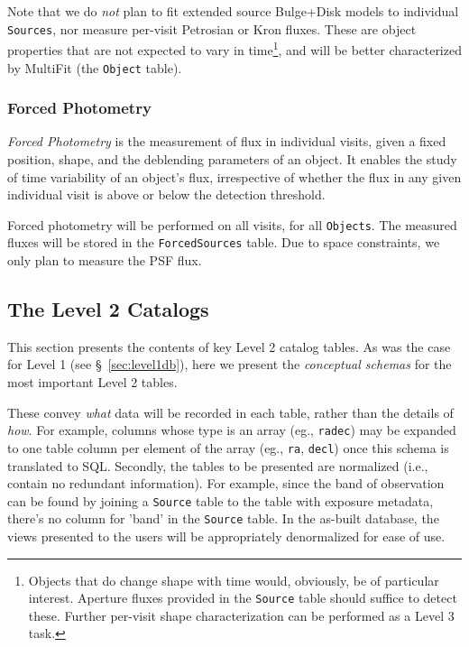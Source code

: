 \documentclass[12pt]{article}
\newcommand{\code}[1]{\texttt{#1}}
\newcommand{\Object}{\code{Object}\xspace}
\newcommand{\Objects}{\code{Objects}\xspace}
\newcommand{\Source}{\code{Source}\xspace}
\newcommand{\Sources}{\code{Sources}\xspace}
\newcommand{\ForcedSources}{\code{ForcedSources}\xspace}
\begin{document}
Note that we do {\em not} plan to fit extended source Bulge+Disk models to individual \Sources, nor measure per-visit Petrosian or Kron fluxes. These are object properties that are not expected to vary in time\footnote{Objects that {\em} do change shape with time would, obviously, be of particular interest. Aperture fluxes provided in the \Source table should suffice to detect these. Further per-visit shape characterization can be performed as a Level 3 task.}, and will be better characterized by MultiFit (the \Object table).

\subsubsection{Forced Photometry}
\label{sec:forcedPhotL2}



{\em Forced Photometry} is the measurement of flux in individual visits, given a fixed position, shape, and the deblending parameters of an object. It enables the study of time variability of an object's flux, irrespective of whether the flux in any given individual visit is above or below the detection threshold.

Forced photometry will be performed on all visits, for all \Objects. The measured fluxes will be stored in the \ForcedSources table. Due to space constraints, we only plan to measure the PSF flux.

\subsection{The Level 2 Catalogs}

This section presents the contents of key Level 2 catalog tables. As was the case for Level 1 (see \S~\ref{sec:level1db}), here we present the {\em conceptual schemas} for the most important Level 2 tables.

These convey {\em what} data will be recorded in each table, rather than the details of {\em how}. For example, columns whose type is an array (eg., \texttt{radec}) may be expanded to one table column per element of the array (eg., \texttt{ra}, \texttt{decl}) once this schema is translated to SQL. Secondly, the tables to be presented are normalized (i.e., contain no redundant information). For example, since the band of observation can be found by joining a \Source table to the table with exposure metadata, there's no column for 'band' in the \Source table. In the as-built database, the views presented to the users will be appropriately denormalized for ease of use.
\end{document}
